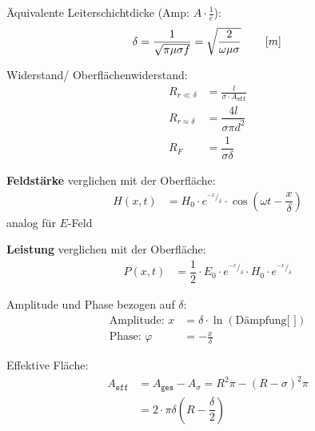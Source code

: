 \begin{description}
    \item Äquivalente Leiterschichtdicke (Amp: $A \cdot \frac{1}{e}$):
        \[
            \delta = \frac{1}{\sqrt{\pi\mu\sigma f}} = \sqrt{\frac{2}{\omega\mu\sigma}} \qquad \left[ m \right] \\
        \]

    \item Widerstand/ Oberflächenwiderstand:
          \begin{align*}
              R_{r\ll\delta}     & = \frac{l}{\sigma \cdot A_{\texttt{eff}}} \\
              R_{r\approx\delta} & =\dfrac{4l}{\sigma \pi d^{2}}             \\
              R_F                & = \dfrac{1}{\sigma \delta}
          \end{align*}

    \item \textbf{Feldstärke} verglichen mit der Oberfläche:
          \begin{align*}
              H\left( x,t\right) & =H_{0}\cdot e^{^{-x}/_\delta}\cdot \cos \left( \omega t-\dfrac{x}{\delta}\right)
          \end{align*}
          analog für $E$-Feld

    \item \textbf{Leistung} verglichen mit der Oberfläche:
          \begin{align*}
              P\left( x,t\right) & =\dfrac{1}{2} \cdot E_{0}\cdot e^{^{-x}/_\delta}\cdot H_{0}\cdot e^{^{-x}/_\delta}
          \end{align*}

    \item Amplitude und Phase bezogen auf $\delta$:
          \begin{align*}
              \text{Amplitude: } x   & =\delta \cdot \ln(\text{Dämpfung[ ]}) \\
              \text{Phase: } \varphi & = -\frac{x}{\delta}
          \end{align*}

    \item Effektive Fläche:
          \begin{align*}
              A_{\texttt{eff}} & = A_{\texttt{ges}} - A_{\sigma} = R^2\pi-(R-\sigma)^2\pi \\
                               & = 2\cdot \pi \delta \left( R-\dfrac{\delta }{2}\right)
          \end{align*}
\end{description}

